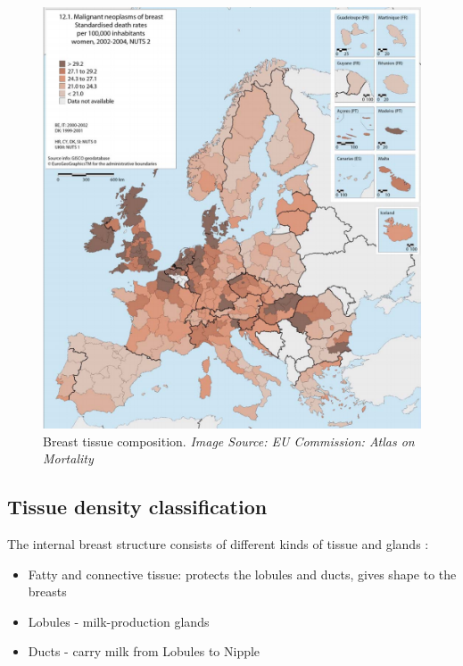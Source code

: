 \begin{figure}[!h]
  \center
  \includegraphics[scale=0.5]{Chapter1/background-img/mortality_EU_Comms.png}
  \caption{Breast tissue composition. \textit{Image Source: EU Commission: Atlas on Mortality \cite{European_Commission_2009}}}
  \label{fig:mortality-band}
\end{figure}

\subsection{Tissue density classification}

The internal breast structure consists of different kinds of tissue and glands \cite{Anatomy_breast}:

\begin{itemize}
  \item Fatty and connective tissue: protects the lobules and ducts, gives shape to the breasts
  \item Lobules - milk-production glands
  \item Ducts - carry milk from Lobules to Nipple
\end{itemize}

